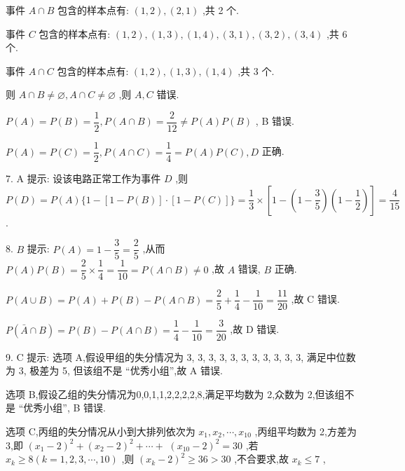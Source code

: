 事件 $A \cap  B$ 包含的样本点有: $\left( {1,2}\right) ,\left( {2,1}\right)$ ,共 2 个.

事件 $C$ 包含的样本点有: $\left( {1,2}\right) ,\left( {1,3}\right) ,\left( {1,4}\right) ,\left( {3,1}\right) ,\left( {3,2}\right) ,\left( {3,4}\right)$ ,共 6 个.

事件 $A \cap  C$ 包含的样本点有: $\left( {1,2}\right) ,\left( {1,3}\right) ,\left( {1,4}\right)$ ,共 3 个.

则 $A \cap  B \neq  \varnothing ,A \cap  C \neq  \varnothing$ ,则 $A,C$ 错误.

$P\left( A\right)  = P\left( B\right)  = \dfrac{1}{2},P\left( {A \cap  B}\right)  = \dfrac{2}{12} \neq  P\left( A\right) P\left( B\right)$ , B 错误.

$P\left( A\right)  = P\left( C\right)  = \dfrac{1}{2},P\left( {A \cap  C}\right)  = \dfrac{1}{4} = P\left( A\right) P\left( C\right) ,D$ 正确.

7. A 提示: 设该电路正常工作为事件 $D$ ,则 $P\left( D\right)  = P\left( A\right) \{ 1 - \left\lbrack  {1 - P\left( B\right) }\right\rbrack   \cdot  \left\lbrack  {1 - P\left( C\right) }\right\rbrack  \}  = \dfrac{1}{3} \times  \left\lbrack  {1 - \left( {1 - \dfrac{3}{5}}\right) \left( {1 - \dfrac{1}{2}}\right) }\right\rbrack   = \dfrac{4}{15}$ .

8. $B$ 提示: $P\left( A\right)  = 1 - \dfrac{3}{5} = \dfrac{2}{5}$ ,从而 $P\left( A\right) P\left( B\right)  = \dfrac{2}{5} \times  \dfrac{1}{4} = \dfrac{1}{10} = P\left( {A \cap  B}\right)  \neq  0$ ,故 $A$ 错误, $B$ 正确.

$P\left( {A \cup  B}\right)  = P\left( A\right)  + P\left( B\right)  - P\left( {A \cap  B}\right)  = \dfrac{2}{5} + \dfrac{1}{4} - \dfrac{1}{10} = \dfrac{11}{20}$ ,故 C 错误.

$P\left( {\bar{A} \cap  B}\right)  = P\left( B\right)  - P\left( {A \cap  B}\right)  = \dfrac{1}{4} - \dfrac{1}{10} = \dfrac{3}{20}$ ,故 D 错误.

9. C 提示: 选项 A,假设甲组的失分情况为 3, 3, 3, 3, 3, 3, 3, 3, 3, 3, 3, 满足中位数为 3, 极差为 5, 但该组不是 “优秀小组”,故 A 错误.

选项 B,假设乙组的失分情况为0,0,1,1,2,2,2,2,8,满足平均数为 2,众数为 2,但该组不是 “优秀小组”, B 错误.

选项 C,丙组的失分情况从小到大排列依次为 ${x}_{1},{x}_{2},\cdots ,{x}_{10}$ ,丙组平均数为 2,方差为 3,即 ${\left( {x}_{1} - 2\right) }^{2} + {\left( {x}_{2} - 2\right) }^{2} + \cdots  +$  ${\left( {x}_{10} - 2\right) }^{2} = {30}$ ,若 ${x}_{k} \geq  8\left( {k = 1,2,3,\cdots ,{10}}\right)$ ,则 ${\left( {x}_{k} - 2\right) }^{2} \geq  {36} > {30}$ ,不合要求,故 ${x}_{k} \leq  7$ ,

